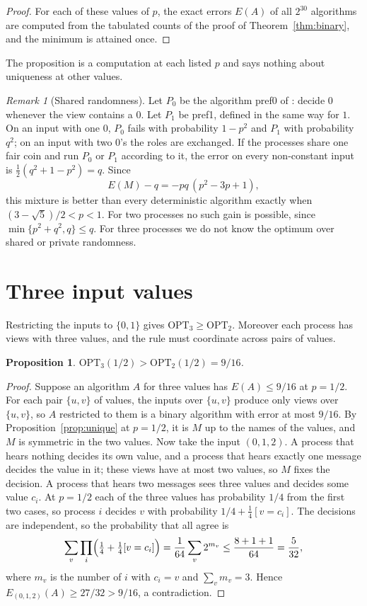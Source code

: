 \documentclass[11pt]{article}
\newtheorem{proposition}[theorem]{Proposition}
\theoremstyle{remark}
\newtheorem{remark}[theorem]{Remark}
\newcommand{\OPT}{\mathrm{OPT}}
\begin{document}
\begin{proof}
For each of these values of $p$, the exact errors $E(A)$ of all $2^{30}$ algorithms are computed from the tabulated counts of the proof of Theorem~\ref{thm:binary}, and the minimum is attained once.
\end{proof}

The proposition is a computation at each listed $p$ and says nothing about uniqueness at other values.

\begin{remark}[Shared randomness]\label{rem:coin}
Let $P_0$ be the algorithm pref0 of \cite{FPR26}: decide $0$ whenever the view contains a $0$. Let $P_1$ be pref1, defined in the same way for $1$. On an input with one $0$, $P_0$ fails with probability $1-p^2$ and $P_1$ with probability $q^2$; on an input with two $0$'s the roles are exchanged. If the processes share one fair coin and run $P_0$ or $P_1$ according to it, the error on every non-constant input is $\tfrac12(q^2+1-p^2)=q$. Since
\[
E(M)-q=-pq\,(p^2-3p+1),
\]
this mixture is better than every deterministic algorithm exactly when $(3-\sqrt5)/2<p<1$. For two processes no such gain is possible, since $\min\{p^2+q^2,q\}\le q$. For three processes we do not know the optimum over shared or private randomness.
\end{remark}

\section{Three input values}\label{sec:three}

Restricting the inputs to $\{0,1\}$ gives $\OPT_3\ge\OPT_2$. Moreover each process has views with three values, and the rule must coordinate across pairs of values.

\begin{proposition}\label{prop:half}
$\OPT_3(1/2)>\OPT_2(1/2)=9/16$.
\end{proposition}

\begin{proof}
Suppose an algorithm $A$ for three values has $E(A)\le 9/16$ at $p=1/2$. For each pair $\{u,v\}$ of values, the inputs over $\{u,v\}$ produce only views over $\{u,v\}$, so $A$ restricted to them is a binary algorithm with error at most $9/16$. By Proposition~\ref{prop:unique} at $p=1/2$, it is $M$ up to the names of the values, and $M$ is symmetric in the two values. Now take the input $(0,1,2)$. A process that hears nothing decides its own value, and a process that hears exactly one message decides the value in it; these views have at most two values, so $M$ fixes the decision. A process that hears two messages sees three values and decides some value $c_i$. At $p=1/2$ each of the three values has probability $1/4$ from the first two cases, so process $i$ decides $v$ with probability $1/4+\tfrac14[v=c_i]$. The decisions are independent, so the probability that all agree is
\[
\sum_{v}\prod_{i}\Bigl(\tfrac14+\tfrac14[v=c_i]\Bigr)=\frac1{64}\sum_v 2^{m_v}\le\frac{8+1+1}{64}=\frac5{32},
\]
where $m_v$ is the number of $i$ with $c_i=v$ and $\sum_v m_v=3$. Hence $E_{(0,1,2)}(A)\ge 27/32>9/16$, a contradiction.
\end{proof}
\end{document}

